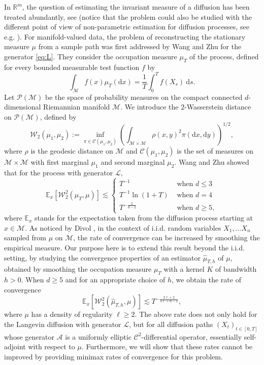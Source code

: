 \documentclass[10pt,a4paper]{article}
\newcommand{\E}{{\mathbb E}}
\newcommand{\R}{{\mathbb R}}
\newcommand{\cL}{\mathcal{L}}
\newcommand\cA{\mathcal{A}}
\newcommand\cC{\mathcal{C}}
\newcommand\cM{\mathcal{M}}
\newcommand\W{\mathcal{W}}
\newcommand\cP{\mathcal{P}}
\newcommand\dd{\mathrm{d}}
\newcommand{\PAR}[1]{{{\left(#1\right)}}} %
\newcommand{\SBRA}[1]{{{\left[#1\right]}}} %
\begin{document}
In $\R^m$, the question of estimating the invariant measure of a diffusion has been treated abundantly, see \cite{Dalalyan,durmusmoulines,pagespanloup2012,Robertstweedie} (notice that the problem could also be studied with the different point of view of non-parametric estimation for diffusion processes, see e.g. \cite{dalalyan2007asymptotic}).
For manifold-valued data, the problem of reconstructing the stationary measure $\mu$ from a sample path was first addressed by Wang and Zhu \cite{Wang2023} for the generator \eqref{eq:L}. They consider the occupation measure $\mu_T$ of the process, defined for every bounded measurable test function $f$ by
\begin{equation}
	\int_{\cM} f(x)    \mu_T(\dd x)=\frac{1}{T} \int_0^T f(X_s)\ \dd s. \label{def:occ_measure}
\end{equation}
Let $\cP(\cM)$ be the space of probability measures on the compact connected $d$-dimensional Riemannian manifold $\cM$. %
We introduce the $2$-Wasserstein distance on $\cP(\cM)$, defined by
\[
\W_2(\mu_1,\mu_2):=\inf_{\pi\in \cC(\mu_1,\mu_2)}\PAR{\int_{\cM\times \cM}\rho (x,y)^2\pi(\dd x,\dd y)}^{1/2},
\]
where $\rho$ is the geodesic distance on $\cM$ and $\cC(\mu_1,\mu_2)$ is the set of measures on $\cM\times \cM$ with first marginal $\mu_1$ and second marginal $\mu_2$. Wang and Zhu \cite[Theorem 1.2]{Wang2023} showed that for the process with generator $\cL$, 
\begin{equation}\label{eq:rate_WZ}
  \E_x\SBRA{\W_2^2(\mu_T,\mu)} \lesssim \begin{cases}
 T^{-1} & \mbox{ when }d\le 3 \\
 T^{-1} \ln(1+T) & \mbox{ when }d=4\\
 T^{-\frac{2}{d-2}} & \mbox{ when }d\ge 5,
\end{cases}  
\end{equation}
where $\E_x$ stands for the expectation taken from the diffusion process starting at $x\in \cM$. 
 As noticed by Divol \cite{Divol2022}, in the context of i.i.d. random variables $X_1,\dots X_n$ sampled from $\mu$ on $\cM$, the rate of convergence can be increased by smoothing the empirical measure. Our purpose here is to  extend this result beyond the i.i.d. setting, by studying the convergence properties of an estimator $\widehat{\mu}_{T,h}$ of $\mu$, obtained by  smoothing the occupation measure $\mu_T$ with a kernel $K$ of bandwidth $h>0$. When $d\ge 5$ and for an appropriate choice of $h$, we obtain the rate of convergence
\begin{equation}
\E_x\SBRA{\W_2^2(\widehat{\mu}_{T,h},\mu)} \lesssim T^{-\frac{2\ell+2}{2\ell+d-2}},
\end{equation}
where $\mu$ has a density of regularity $\ell \ge 2$. The above rate does not only hold for the Langevin diffusion with generator $\cL$, but for all diffusion paths $(X_t)_{t\in [0,T]}$ whose generator $\cA$ is a uniformly elliptic $\cC^2$-differential operator, essentially self-adjoint with respect to $\mu$. Furthermore, 
we will show that these rates cannot be improved by providing minimax rates of convergence for this problem.
\end{document}
